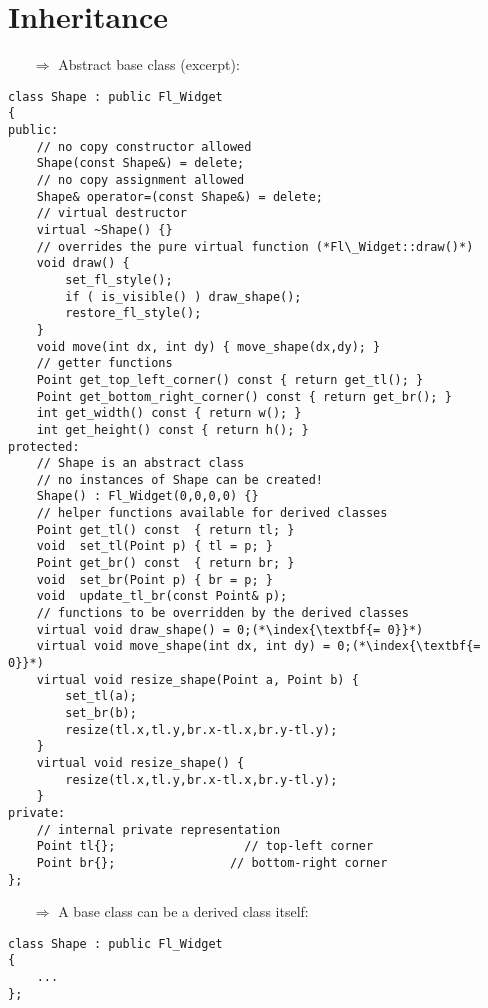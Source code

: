 \documentclass[10pt]{article}
\begin{document}
\section{Inheritance}
\small
\begin{enumerate}
\item[$\Rightarrow$] Abstract base class (excerpt):
\end{enumerate}
\begin{lstlisting}
class Shape : public Fl_Widget
{
public:
    // no copy constructor allowed
    Shape(const Shape&) = delete;
    // no copy assignment allowed
    Shape& operator=(const Shape&) = delete;
    // virtual destructor
    virtual ~Shape() {}
    // overrides the pure virtual function (*Fl\_Widget::draw()*)
    void draw() {
        set_fl_style();
        if ( is_visible() ) draw_shape();
        restore_fl_style();
    }
    void move(int dx, int dy) { move_shape(dx,dy); }
    // getter functions
    Point get_top_left_corner() const { return get_tl(); }
    Point get_bottom_right_corner() const { return get_br(); }
    int get_width() const { return w(); }
    int get_height() const { return h(); }
protected:
    // Shape is an abstract class
    // no instances of Shape can be created!
    Shape() : Fl_Widget(0,0,0,0) {}
    // helper functions available for derived classes
    Point get_tl() const  { return tl; }
    void  set_tl(Point p) { tl = p; }
    Point get_br() const  { return br; }
    void  set_br(Point p) { br = p; }
    void  update_tl_br(const Point& p);
    // functions to be overridden by the derived classes
    virtual void draw_shape() = 0;(*\index{\textbf{= 0}}*)
    virtual void move_shape(int dx, int dy) = 0;(*\index{\textbf{= 0}}*)
    virtual void resize_shape(Point a, Point b) {
        set_tl(a);
        set_br(b);
        resize(tl.x,tl.y,br.x-tl.x,br.y-tl.y);
    }
    virtual void resize_shape() {
        resize(tl.x,tl.y,br.x-tl.x,br.y-tl.y);
    }
private:
    // internal private representation
    Point tl{};                  // top-left corner
    Point br{};                // bottom-right corner
};
\end{lstlisting}
\begin{enumerate}
\item[$\Rightarrow$] A base class can be a derived class itself:
\end{enumerate}
\begin{lstlisting}
class Shape : public Fl_Widget
{
    ...
};
\end{lstlisting}
\end{document}
